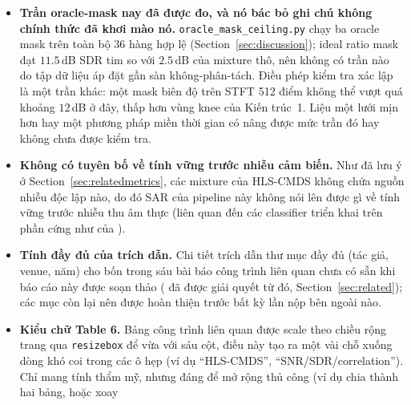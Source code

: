 \documentclass[11pt]{article}
\begin{document}
\begin{itemize}
    $K_r{=}20$, 100 và 60 vòng lặp multiplicative-update cùng cửa sổ STFT
    được xác nhận đúng, và việc đối chiếu tìm thấy hai sai khác đã được
    sửa --- hop STFT trước đó là 128 chưa kiểm chứng (của bài là 256), và
    bài báo khử nhiễu mọi đoạn bằng bandpass 50--1800\,Hz trước STFT, một
    giai đoạn mà bản tái hiện đầu tiên thiếu. Không thay đổi nào dịch SDR
    toàn tập của Baseline~2 quá độ phân tán giữa các fold, nên sự thiếu
    hụt của phương pháp so với Baseline~1 không do hai điều đó gây ra.
    Mô tả tập huấn luyện của chính bài báo vẫn mơ hồ giữa
    ICBHI\,2017+Fraiwan và các bản ghi isolated của HLS-CMDS
    (Table~\ref{tab:related}); dự án này fit trên các bản ghi isolated
    của HLS-CMDS dưới pool an toàn rò rỉ và nói rõ điều đó.
  \item \textbf{Trần oracle-mask nay đã được đo, và nó bác bỏ ghi chú
    không chính thức đã khơi mào nó.} \texttt{oracle\_mask\_ceiling.py}
    chạy ba oracle mask trên toàn bộ 36 hàng hợp lệ
    (Section~\ref{sec:discussion}); ideal ratio mask đạt $11.5$\,dB SDR
    tim so với $2.5$\,dB của mixture thô, nên không có trần nào do tập dữ
    liệu áp đặt gần sàn không-phân-tách. Điều phép kiểm tra xác lập là
    một trần khác: một mask biên độ trên STFT 512 điểm không thể vượt quá
    khoảng $12$\,dB ở đây, thấp hơn vùng knee của Kiến trúc~1. Liệu một
    lưới mịn hơn hay một phương pháp miền thời gian có nâng được mức trần
    đó hay không chưa được kiểm tra.
  \item \textbf{Không có tuyên bố về tính vững trước nhiễu cảm biến.}
    Như đã lưu ý ở Section~\ref{sec:relatedmetrics}, các mixture của
    HLS-CMDS không chứa nguồn nhiễu độc lập nào, do đó SAR của pipeline
    này không nói lên được gì về tính vững trước nhiễu thu âm thực (liên
    quan đến
các classifier triển khai trên phần cứng như của \cite{edgelung}).
  \item \textbf{Tính đầy đủ của trích dẫn.} Chi tiết trích dẫn thư mục
    đầy đủ (tác giả, venue, năm) cho bốn trong sáu bài báo công trình
    liên quan chưa có sẵn khi báo cáo này được soạn thảo (\cite{nmfcrnn}
    đã được giải quyết từ đó, Section~\ref{sec:related}); các mục còn
    lại nên được hoàn thiện trước bất kỳ lần nộp bên ngoài nào.
  \item \textbf{Kiểu chữ Table 6.} Bảng công trình liên quan được scale
    theo chiều rộng trang qua \texttt{resizebox} để vừa với sáu cột,
    điều này tạo ra một vài chỗ xuống dòng khó coi trong các ô hẹp (ví
    dụ ``HLS-CMDS'', ``SNR/SDR/correlation''). Chỉ mang tính thẩm mỹ,
    nhưng đáng để mở rộng thủ công (ví dụ chia thành hai bảng, hoặc xoay

\end{itemize}
\end{document}
